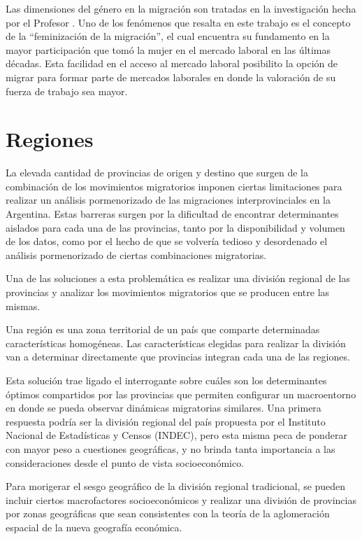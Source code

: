 \documentclass[12pt,a4paper]{article}
\begin{document}
Las dimensiones del género en la migración son tratadas en la investigación hecha por el Profesor \textcite{carling_gender_2005}. Uno de los fenómenos que resalta en este trabajo es el concepto de la ``feminización de la migración'', el cual encuentra su fundamento en la mayor participación que tomó la mujer en el mercado laboral en las últimas décadas. Esta facilidad en el acceso al mercado laboral posibilito la opción de migrar para formar parte de mercados laborales en donde la valoración de su fuerza de trabajo sea mayor. 


\newpage
\section{Regiones}

La elevada cantidad de provincias de origen y destino que surgen de la combinación de los movimientos migratorios imponen  ciertas limitaciones para realizar un análisis pormenorizado de las migraciones interprovinciales en la Argentina. Estas barreras surgen por la dificultad de encontrar determinantes aislados para cada una de las provincias, tanto por la disponibilidad y volumen de los datos, como por el hecho de que se volvería tedioso y desordenado el análisis pormenorizado de ciertas combinaciones migratorias.

Una de las soluciones a esta problemática es realizar una división regional de las provincias y analizar los movimientos migratorios que se producen entre las mismas.

Una región es una zona territorial de un país que comparte determinadas características homogéneas. Las características elegidas para realizar la división van a determinar directamente que provincias integran cada una de las regiones.

Esta solución trae ligado el interrogante sobre cuáles son los determinantes óptimos compartidos por las provincias que permiten configurar un macroentorno en donde se pueda observar dinámicas migratorias similares. Una primera respuesta podría ser la división regional del país propuesta por el Instituto Nacional de Estadísticas y Censos (INDEC), pero esta misma peca de ponderar con mayor peso a cuestiones geográficas, y no brinda tanta importancia a las consideraciones desde el punto de vista socioeconómico.

Para morigerar el sesgo geográfico de la división regional tradicional, se pueden incluir ciertos macrofactores socioeconómicos y realizar una división  de provincias por zonas geográficas que  sean consistentes con la teoría de la aglomeración espacial de la nueva geografía económica.
\end{document}
